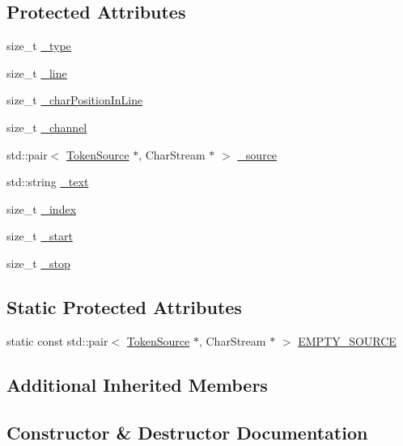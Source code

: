 \subsection*{Protected Attributes}
\begin{DoxyCompactItemize}
\item 
size\+\_\+t \hyperlink{classantlr4_1_1CommonToken_a8901b11131c9b69c76b608bb9a91276a}{\+\_\+type}
\item 
size\+\_\+t \hyperlink{classantlr4_1_1CommonToken_abd24cb6b67e6b2c9265946edf79a0fcb}{\+\_\+line}
\item 
size\+\_\+t \hyperlink{classantlr4_1_1CommonToken_a56bf632f84aa6876618eb05b06bb17d3}{\+\_\+char\+Position\+In\+Line}
\item 
size\+\_\+t \hyperlink{classantlr4_1_1CommonToken_ad3083101ad942a5c64e0c97e08e5e431}{\+\_\+channel}
\item 
std\+::pair$<$ \hyperlink{classantlr4_1_1TokenSource}{Token\+Source} $\ast$, Char\+Stream $\ast$ $>$ \hyperlink{classantlr4_1_1CommonToken_af90c2b9365ae2ff2691203787df762ba}{\+\_\+source}
\item 
std\+::string \hyperlink{classantlr4_1_1CommonToken_af99af5ac1af2ef27bc8ac82f92128be8}{\+\_\+text}
\item 
size\+\_\+t \hyperlink{classantlr4_1_1CommonToken_a9a10b67e5076290d167f40d72ae9ebe6}{\+\_\+index}
\item 
size\+\_\+t \hyperlink{classantlr4_1_1CommonToken_ad5c165b3dea24673a81f80570fc24e6a}{\+\_\+start}
\item 
size\+\_\+t \hyperlink{classantlr4_1_1CommonToken_af82f8b915396bde4143d1cc4722373fd}{\+\_\+stop}
\end{DoxyCompactItemize}
\subsection*{Static Protected Attributes}
\begin{DoxyCompactItemize}
\item 
static const std\+::pair$<$ \hyperlink{classantlr4_1_1TokenSource}{Token\+Source} $\ast$, Char\+Stream $\ast$ $>$ \hyperlink{classantlr4_1_1CommonToken_a667bc5a6c9106158af496b25b92b54be}{E\+M\+P\+T\+Y\+\_\+\+S\+O\+U\+R\+CE}
\end{DoxyCompactItemize}
\subsection*{Additional Inherited Members}


\subsection{Constructor \& Destructor Documentation}
\mbox{\label{classantlr4_1_1CommonToken_ae611986affd43e33d45ec933b602e3d6}} 
